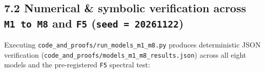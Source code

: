 \documentclass[10pt,letterpaper]{article}
\begin{document}
\subsection{\texorpdfstring{7.2 Numerical \& symbolic verification
across \texttt{M1\ to\ M8} and \texttt{F5}
(\texttt{seed\ =\ 20261122})}{7.2 Numerical \& symbolic verification across M1 to M8 and F5 (seed = 20261122)}}\label{numerical-symbolic-verification-across-m1-to-m8-and-f5-seed-20261122}

Executing \texttt{code\_\allowbreak{}and\_\allowbreak{}proofs/\allowbreak{}run\_\allowbreak{}models\_\allowbreak{}m1\_\allowbreak{}m8.\allowbreak{}py} produces
deterministic JSON verification
(\texttt{code\_\allowbreak{}and\_\allowbreak{}proofs/\allowbreak{}models\_\allowbreak{}m1\_\allowbreak{}m8\_\allowbreak{}results.\allowbreak{}json}) across all
eight models and the pre-registered \texttt{F5} spectral test:
\end{document}

